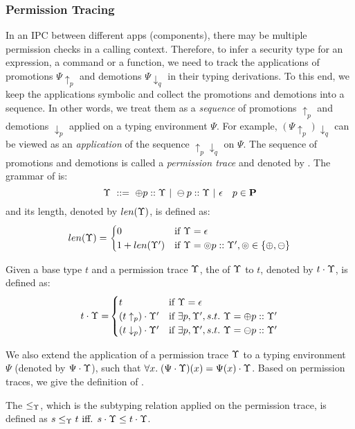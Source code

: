 {{{\subsubsection{\textbf{Permission Tracing}}\label{sec:trace_rules}
In an IPC between different apps (components), there may be multiple permission checks in a calling context.
Therefore, to infer a security type for an expression, a command or a function, we need to track
the applications of promotions $\Psi\!\uparrow_{p}$ and demotions $\Psi\!\downarrow_{q}$ in their typing derivations.
To this end,  we keep the applications symbolic and collect the promotions and demotions into a sequence.
In other words, we treat them as a \emph{sequence} of promotions $\uparrow_{p}$ and demotions $\downarrow_{p}$ applied on a typing environment $\Psi$.
For example, $(\Psi\!\uparrow_{p})\downarrow_{q}$ can be viewed as
an \emph{application} of the sequence $\uparrow_{p}\downarrow_{q}$ on $\Psi$.
The sequence of promotions and demotions is called a \emph{permission trace} and denoted by {\trace}. The grammar of {\trace} is:
{\myeqsize\begin{equation*}
\Upsilon~::=~\oplus p ::\Upsilon~|~ \ominus p :: \Upsilon~|~ \epsilon
\quad p\in \mathbf{P}
\end{equation*}}
and its length, denoted by $len(\Upsilon)$, is defined as:
{\myeqsize\begin{align*}
	len(\Upsilon)=
	\begin{cases}
	    0 & \text{if}~ \Upsilon=\epsilon\\
		1+len(\Upsilon') & \text{if}~ \Upsilon=\circledcirc p :: \Upsilon', \circledcirc  \in\{\oplus , \ominus \}
	\end{cases}
\end{align*}}
\begin{definition}\label{def:app-pt-t}
Given a base type $t$ and a permission trace $\Upsilon$, the  of $\Upsilon$ to $t$, denoted by $t\cdot\Upsilon$,  is defined as:
{\myeqsize\begin{equation*}
{t\cdot \ensuremath{\Upsilon}=}
\begin{cases}
t & {\normalfont\text{if}}~\Upsilon = \epsilon\\
(t\uparrow_{p})\cdot \Upsilon' & {\normalfont\text{if}}~\exists p, \Upsilon', s.t.~\Upsilon = \oplus p :: \Upsilon'\\
(t\downarrow_{p})\cdot \Upsilon' & {\normalfont\text{if}}~\exists p, \Upsilon', s.t.~\Upsilon = \ominus p :: \Upsilon'
\end{cases}
\end{equation*}}
\end{definition}
We also extend the application of a permission trace $\Upsilon$ to a typing environment $\Psi$ (denoted by $\Psi\cdot\Upsilon$), such that $\forall x.\; (\Psi\cdot{\ensuremath{\Upsilon}})(x) = \Psi(x)\cdot \Upsilon$.
Based on permission traces, we give the definition of .
\begin{definition}\label{def:partial-subtype}
The  $\leq_{\Upsilon} $, which is the subtyping relation applied on the permission trace, is defined as $s\leq_{\Upsilon}  t \text{ iff. } s\cdot \Upsilon \leq t\cdot \Upsilon$.
\end{definition}

}}}
